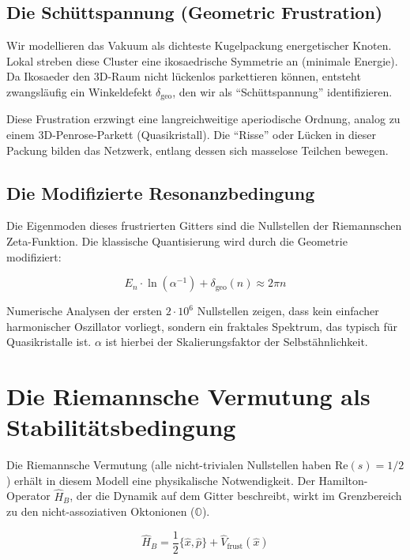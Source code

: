 \documentclass[11pt, a4paper]{article}
\begin{document}
	\subsection{Die Schüttspannung (Geometric Frustration)}
	Wir modellieren das Vakuum als dichteste Kugelpackung energetischer Knoten. Lokal streben diese Cluster eine ikosaedrische Symmetrie an (minimale Energie). Da Ikosaeder den 3D-Raum nicht lückenlos parkettieren können, entsteht zwangsläufig ein Winkeldefekt $\delta_{\text{geo}}$, den wir als "`Schüttspannung"' identifizieren.
	
	Diese Frustration erzwingt eine langreichweitige aperiodische Ordnung, analog zu einem 3D-Penrose-Parkett (Quasikristall). Die "`Risse"' oder Lücken in dieser Packung bilden das Netzwerk, entlang dessen sich masselose Teilchen bewegen.
	
	\subsection{Die Modifizierte Resonanzbedingung}
	Die Eigenmoden dieses frustrierten Gitters sind die Nullstellen der Riemannschen Zeta-Funktion. Die klassische Quantisierung wird durch die Geometrie modifiziert:
	
	\begin{equation}
		E_n \cdot \ln(\alpha^{-1}) + \delta_{\text{geo}}(n) \approx 2\pi n
	\end{equation}
	
	Numerische Analysen der ersten $2\cdot 10^6$ Nullstellen zeigen, dass kein einfacher harmonischer Oszillator vorliegt, sondern ein fraktales Spektrum, das typisch für Quasikristalle ist. $\alpha$ ist hierbei der Skalierungsfaktor der Selbstähnlichkeit.
	
	\section{Die Riemannsche Vermutung als Stabilitätsbedingung}
	
	Die Riemannsche Vermutung (alle nicht-trivialen Nullstellen haben $\text{Re}(s) = 1/2$) erhält in diesem Modell eine physikalische Notwendigkeit.
	Der Hamilton-Operator $\hat{H}_B$, der die Dynamik auf dem Gitter beschreibt, wirkt im Grenzbereich zu den nicht-assoziativen Oktonionen ($\mathbb{O}$).
	
	\begin{equation}
		\hat{H}_B = \frac{1}{2} \{ \hat{x}, \hat{p} \} + \hat{V}_{\text{frust}}(\hat{x})
	\end{equation}
	
\end{document}
